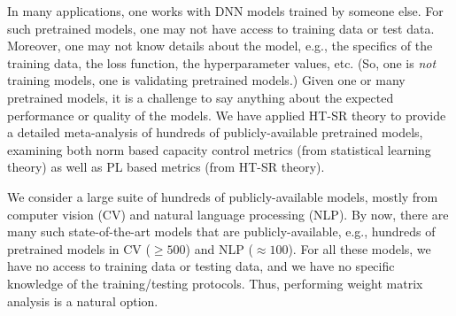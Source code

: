 \documentclass{article}
\begin{document}
In many applications, one works with DNN models trained by someone else.
For such pretrained models, one may not have access to training data or test data.
Moreover, one may not know details about the model, e.g., the specifics of the training data, the loss function, the hyperparameter values, etc.
(So, one is \emph{not} training models, one is validating pretrained models.)
Given one or many pretrained models, it is a challenge to say anything about the expected performance or quality of the models.
We have applied HT-SR theory to provide a detailed meta-analysis of hundreds of publicly-available pretrained models, examining both norm based capacity control metrics (from statistical learning theory) as well as PL based metrics (from HT-SR theory).

We consider a large suite of hundreds of publicly-available models, mostly from computer vision (CV) and natural language processing (NLP).
By now, there are many such state-of-the-art models that are publicly-available, e.g., 
hundreds of pretrained models in CV ($\ge 500$) and NLP ($\approx 100$).
For all these models, we have no access to training data or testing data, and we have no specific knowledge of the training/testing protocols. 
Thus, performing weight matrix analysis is a natural option.
\end{document}
